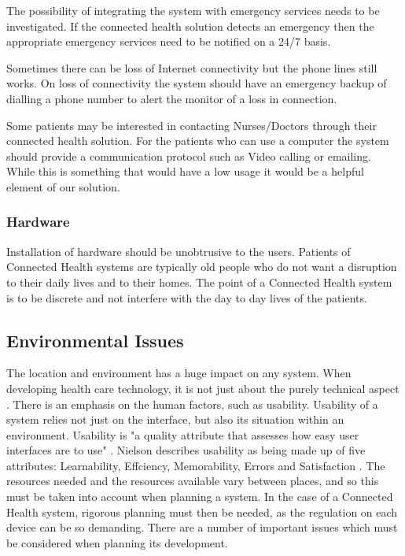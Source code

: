 The possibility of integrating the system with emergency services needs to be investigated. If the connected health solution detects an emergency then  the appropriate emergency services need to be notified on a 24/7 basis. 

Sometimes there can be loss of Internet connectivity but the phone lines still works. On loss of connectivity the system should have an emergency backup of dialling a phone number to alert the monitor of a loss in connection. 

Some patients may be interested in contacting Nurses/Doctors through their connected health solution. For the patients who can use a computer the system should provide a communication protocol such as Video calling or emailing. While this is something that would have a low usage it would be a helpful element of our solution.

\subsubsection{Hardware}

Installation of hardware should be unobtrusive to the users. Patients of Connected Health systems are typically old people who do not want a disruption to their daily lives and to their homes. The point of a Connected Health system is to be discrete and not interfere with the day to day lives of the patients.

\subsection{Environmental Issues}

The location and environment has a huge impact on any system. When developing health care technology, it is not just about the purely technical aspect \parencite{env}. There is an emphasis on the human factors, such as usability. Usability of a system relies not just on the interface, but also its situation within an environment. Usability is "a quality attribute that assesses how easy user interfaces are to use" \parencite{usability1}. Nielson describes usability as being made up of five attributes: Learnability, Effciency, Memorability, Errors and Satisfaction \parencite{usability2}. The resources needed and the resources available vary between places, and so this must be taken into account when planning a system. In the case of a Connected Health system, rigorous planning must then be needed, as the regulation on each device can be so demanding. There are a number of important issues which must be considered when planning its development.

